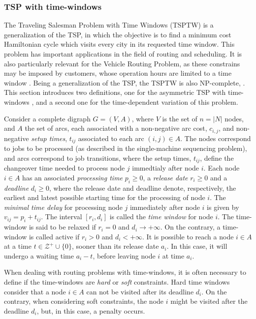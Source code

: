 \subsubsection{TSP with time-windows}
\label{sec:time-windows-tsp}

The Traveling Salesman Problem with Time Windows (TSPTW) is a generalization of the TSP, in which the objective is to find a minimum cost Hamiltonian cycle which visits every city in its requested time window. This problem has important applications in the field of routing and scheduling. It is also particularly relevant for the Vehicle Routing Problem, as these constrains may be imposed by customers, whose operation hours  are limited to a time window \cite{vrptw_exact}. Being a generalization of the TSP, the TSPTW is also NP-complete, \cite{tsptw_exact}. This section introduces two definitions, one for the asymmetric TSP with time-windows \cite{tsptw_polyhedra}, and a second one for the time-dependent variation \cite{tsptw_exact} of this problem.

Consider a complete digraph $G = (V, A)$, where $V$ is the set of $n = |N|$ nodes, and $A$ the set of arcs, each associated with a non-negative arc cost, $c_{i,j}$, and non-negative \textit{setup times}, $t_{ij}$ associated to each arc $(i, j) \in A$. The nodes correspond to jobs to be processed (as described in the single-machine sequencing problem), and arcs correspond to job transitions, where the setup times, $t_{ij}$, define the changeover time needed to process node $j$ immedtialy after node $i$. Each node $i \in A$ has an associated \textit{processing time} $p_{i} \geq 0$, a \textit{release date} $r_{i} \geq 0$ and a \textit{deadline} $d_{i} \geq 0$, where the release date and deadline denote, respectively, the earliest and latest possible starting time for the processing of node $i$.  The \textit{minimal time delay} for processing node $j$ immediately after node $i$ is given by $v_{ij} = p_{i} + t_{ij}$. The interval $[r_{i}, d_{i}]$ is called the \textit{time window} for node $i$. The time-window is said to be relaxed if $r_{i} = 0$ and $ d_{i} \rightarrow +\infty$. On the contrary, a time-window is called active if $r_{i} > 0$ and $ d_{i} < +\infty$. It is possible to reach a node $i \in A$ at a time $t \in \mathcal{Z}^+ \cup \{0\}$, sooner than its release date $a_{i}$. In this case, it will undergo a waiting time $a_i-t$, before leaving node $i$ at time $a_{i}$.

When dealing with routing problems with time-windows, it is often necessary to define if the time-windows are \textit{hard} or \textit{soft} constraints. Hard time windows consider that a node $i \in A$ can not be visited after its deadline $d_{i}$. On the contrary, when considering soft constraints, the node $i$ might be visited after the deadline $d_{i}$, but, in this case, a penalty occurs.


